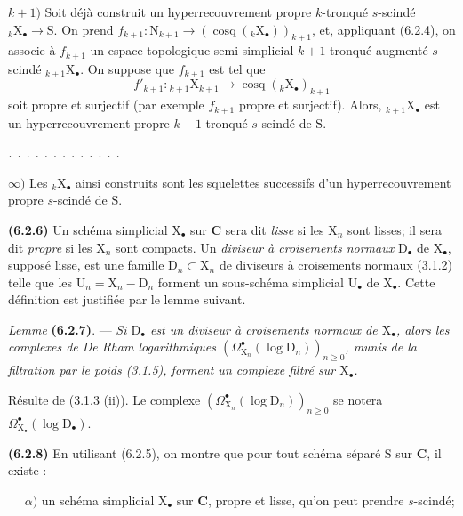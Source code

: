 \documentclass[11pt,leqno]{article}
\newcommand{\Page}[1]{\ifvmode\noindent\else\unskip\ \fi{\footnotesize\textcolor{gray}{[p.\,#1]}}\ \ignorespaces}
\begin{document}
\(k+1)\) Soit déjà construit un hyperrecouvrement propre \(k\)-tronqué \(s\)-scindé \({}_{k}\mathrm{X}_{\bullet}\to\mathrm{S}\). On prend \(f_{k+1}:\mathrm{N}_{k+1}\to(\operatorname{cosq}({}_{k}\mathrm{X}_{\bullet}))_{k+1}\), et, appliquant (6.2.4), on associe à \(f_{k+1}\) un espace topologique semi-simplicial \(k+1\)-tronqué augmenté \(s\)-scindé \({}_{k+1}\mathrm{X}_{\bullet}\). On suppose que \(f_{k+1}\) est tel que
\[
f'_{k+1}:{}_{k+1}\mathrm{X}_{k+1}
\to\operatorname{cosq}({}_{k}\mathrm{X}_{\bullet})_{k+1}
\]
soit propre et surjectif (par exemple \(f_{k+1}\) propre et surjectif). Alors, \({}_{k+1}\mathrm{X}_{\bullet}\) est un hyperrecouvrement propre \(k+1\)-tronqué \(s\)-scindé de \(\mathrm{S}\).

\noindent\(\ldotp\;\ldotp\;\ldotp\;\ldotp\;\ldotp\;\ldotp\;\ldotp\;\ldotp\;\ldotp\;\ldotp\;\ldotp\;\ldotp\;\ldotp\)

\(\infty)\) Les \({}_{k}\mathrm{X}_{\bullet}\) ainsi construits sont les squelettes successifs d’un hyperrecouvrement propre \(s\)-scindé de \(\mathrm{S}\).

\textbf{(6.2.6)} Un schéma simplicial \(\mathrm{X}_{\bullet}\) sur \(\mathbf{C}\) sera dit \textit{lisse} si les \(\mathrm{X}_n\) sont lisses; il sera dit \textit{propre} si les \(\mathrm{X}_n\) sont compacts. Un \textit{diviseur à croisements normaux} \(\mathrm{D}_{\bullet}\) de \(\mathrm{X}_{\bullet}\), supposé lisse, est une famille \(\mathrm{D}_n\subset\mathrm{X}_n\) de diviseurs à croisements normaux (3.1.2) telle que les \(\mathrm{U}_n=\mathrm{X}_n-\mathrm{D}_n\) forment un sous-schéma simplicial \(\mathrm{U}_{\bullet}\) de \(\mathrm{X}_{\bullet}\). Cette définition est justifiée par le lemme suivant.

\textit{Lemme} \textbf{(6.2.7)}. — \textit{Si \(\mathrm{D}_{\bullet}\) est un diviseur à croisements normaux de \(\mathrm{X}_{\bullet}\), alors les complexes de De Rham logarithmiques \((\Omega_{\mathrm{X}_n}^{\bullet}(\log\mathrm{D}_n))_{n\geq 0}\), munis de la filtration par le poids \textup{(3.1.5)}, forment un complexe filtré sur \(\mathrm{X}_{\bullet}\).}

Résulte de (3.1.3 (ii)). Le complexe \((\Omega_{\mathrm{X}_n}^{\bullet}(\log\mathrm{D}_n))_{n\geq 0}\) se notera \(\Omega_{\mathrm{X}_{\bullet}}^{\bullet}(\log\mathrm{D}_{\bullet})\).

\textbf{(6.2.8)} En utilisant (6.2.5), on montre que pour tout schéma séparé \(\mathrm{S}\) sur \(\mathbf{C}\), il existe :

\Page{21}
\noindent
\(\alpha)\) un schéma simplicial \(\mathrm{X}_{\bullet}\) sur \(\mathbf{C}\), propre et lisse, qu’on peut prendre \(s\)-scindé;
\end{document}
